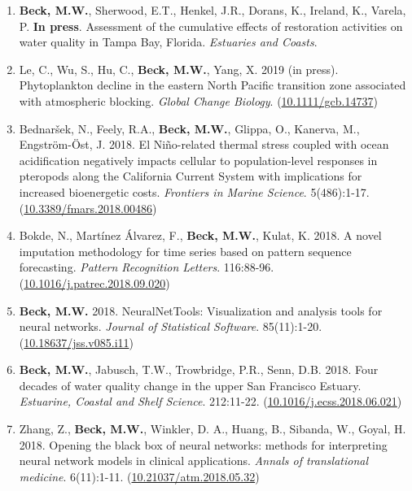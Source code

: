 \documentclass[letterpaper,12pt]{article}
\begin{document}
\begin{enumerate}

\item \textbf{Beck, M.W.}, Sherwood, E.T., Henkel, J.R., Dorans, K., Ireland, K., Varela, P. \textbf{In press}. Assessment of the cumulative effects of restoration activities on water quality in Tampa Bay, Florida. \textit{Estuaries and Coasts}. 

\item Le, C., Wu, S., Hu, C., \textbf{Beck, M.W.}, Yang, X. 2019 (in press). Phytoplankton decline in the eastern {N}orth {P}acific transition zone associated with atmospheric blocking. \textit{Global Change Biology}. ({\footnotesize\href{https://doi.org/10.1111/gcb.14737}{10.1111/gcb.14737}})

\item Bednar\v{s}ek, N., Feely, R.A., \textbf{Beck, M.W.}, Glippa, O., Kanerva, M., Engstr\"{o}m-\"{O}st, J. 2018. El Ni\~{n}o-related thermal stress coupled with ocean acidification negatively impacts cellular to population-level responses in pteropods along the {C}alifornia {C}urrent {S}ystem with implications for increased bioenergetic costs. \textit{Frontiers in Marine Science}. 5(486):1-17. ({\footnotesize\href{https://doi.org/10.3389/fmars.2018.00486}{10.3389/fmars.2018.00486}})

\item Bokde, N., Mart\'{i}nez \'{A}lvarez, F., \textbf{Beck, M.W.}, Kulat, K. 2018. A novel imputation methodology for time series based on pattern sequence forecasting. \textit{Pattern Recognition Letters}. 116:88-96. ({\footnotesize\href{https://doi.org/10.1016/j.patrec.2018.09.020}{10.1016/j.patrec.2018.09.020}})

\item \textbf{Beck, M.W.} 2018. NeuralNetTools: Visualization and analysis tools for neural networks. \textit{Journal of Statistical Software}. 85(11):1-20. ({\footnotesize\href{http://dx.doi.org/10.18637/jss.v085.i11}{10.18637/jss.v085.i11}})

\item \textbf{Beck, M.W.}, Jabusch, T.W., Trowbridge, P.R., Senn, D.B. 2018. Four decades of water quality change in the upper San Francisco Estuary. \textit{Estuarine, Coastal and Shelf Science}. 212:11-22. ({\footnotesize\href{https://doi.org/10.1016/j.ecss.2018.06.021}{10.1016/j.ecss.2018.06.021}})

\item Zhang, Z., \textbf{Beck, M.W.}, Winkler, D. A., Huang, B., Sibanda, W., Goyal, H. 2018. Opening the black box of neural networks: methods for interpreting neural network models in clinical applications. \textit{Annals of translational medicine}. 6(11):1-11. ({\footnotesize\href{http://dx.doi.org/10.21037/atm.2018.05.32}{10.21037/atm.2018.05.32}})


\end{enumerate}
\end{document}
